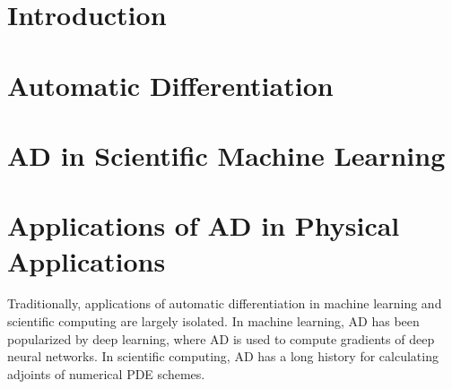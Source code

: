 \documentclass[3p,preprint,12pt]{elsarticle}
\newcommand{\cmark}{\ding{51}}
\newcommand{\xmark}{\ding{55}}
\begin{document}
\newtheorem{theorem}{Theorem}
\newtheorem{lemma}{Lemma}

\begin{frontmatter}

\title{}

\author[]{}
\ead{}
\address[]{}
 

%
%
 
\begin{abstract}
\end{abstract}

\begin{keyword}

\end{keyword}

\end{frontmatter}


\section{Introduction}


\section{Automatic Differentiation}


\section{AD in Scientific Machine Learning}


\section{Applications of AD in Physical Applications}

Traditionally, applications of automatic differentiation in machine learning and scientific computing are largely isolated. In machine learning, AD has been popularized by deep learning, where AD is used to compute gradients of deep neural networks. In scientific computing, AD has a long history for calculating adjoints of numerical PDE schemes. 
\end{document}
